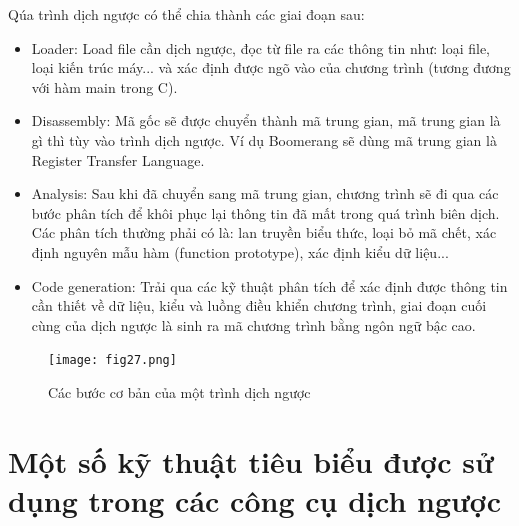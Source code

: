 Qúa trình dịch ngược có thể chia thành các giai đoạn sau:
\begin{itemize}
	\item Loader: Load file cần dịch ngược, đọc từ file ra các thông tin như: loại file, loại kiến trúc máy... và xác định được ngõ vào của chương trình (tương đương với hàm main trong C).
	\item Disassembly: Mã gốc sẽ được chuyển thành mã trung gian, mã trung gian là gì thì tùy vào trình dịch ngược. Ví dụ Boomerang sẽ dùng mã trung gian là Register Transfer Language.
	\item Analysis: Sau khi đã chuyển sang mã trung gian, chương trình sẽ đi qua các bước phân tích để khôi phục lại thông tin đã mất trong quá trình biên dịch. Các phân tích thường phải có là: lan truyền biểu thức, loại bỏ mã chết, xác định nguyên mẫu hàm (function prototype), xác định kiểu dữ liệu...
	\item Code generation: Trải qua các kỹ thuật phân tích để xác định được thông tin cần thiết về dữ liệu, kiểu và luồng điều khiển chương trình, giai đoạn cuối cùng của dịch ngược là sinh ra mã chương trình bằng ngôn ngữ bậc cao. 
\end{itemize}
\begin{figure}[h]
	\centering
	\texttt{[image: fig27.png]}
	\caption{Các bước cơ bản của một trình dịch ngược}
\end{figure}
\section{Một số kỹ thuật tiêu biểu được sử dụng trong các công cụ dịch ngược}


